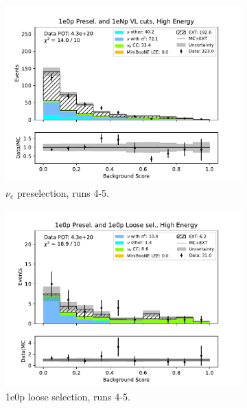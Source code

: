 \begin{figure}[H]
\begin{subfigure}{0.5\linewidth}
    \includegraphics[width=\linewidth]{technote/Sidebands/Figures/FarSideband/far_sideband_bkg_score_run4b4c4d5_ZP_ZP_HIGH_ENERGY.pdf}
    \caption{$\nu_e$ preselection, runs 4-5.}
    \end{subfigure}%
    \begin{subfigure}{0.5\linewidth}
    \includegraphics[width=\linewidth]{technote/Sidebands/Figures/FarSideband/far_sideband_bkg_score_run4b4c4d5_ZP_ZPLOOSESEL_HIGH_ENERGY.pdf}
    \caption{1e0p loose selection, runs 4-5.}
    \end{subfigure}
    \begin{subfigure}{0.5\linewidth}

\end{subfigure}
\end{figure}
